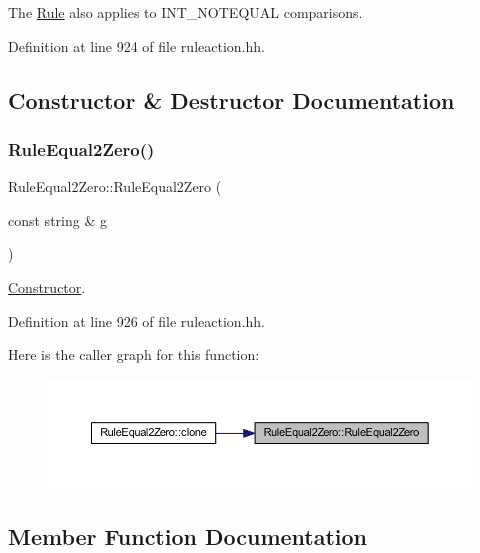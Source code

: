 The \mbox{\hyperlink{class_rule}{Rule}} also applies to I\+N\+T\+\_\+\+N\+O\+T\+E\+Q\+U\+AL comparisons. 

Definition at line 924 of file ruleaction.\+hh.



\subsection{Constructor \& Destructor Documentation}
\mbox{\label{class_rule_equal2_zero_a2dabc21e58113908e57df8192cc1c26f}} 
\subsubsection{\texorpdfstring{RuleEqual2Zero()}{RuleEqual2Zero()}}
{\footnotesize\ttfamily Rule\+Equal2\+Zero\+::\+Rule\+Equal2\+Zero (\begin{DoxyParamCaption}\item[{const string \&}]{g }\end{DoxyParamCaption})\hspace{0.3cm}{\ttfamily [inline]}}



\mbox{\hyperlink{class_constructor}{Constructor}}. 



Definition at line 926 of file ruleaction.\+hh.

Here is the caller graph for this function\+:
\nopagebreak
\begin{figure}[H]
\begin{center}
\leavevmode
\includegraphics[width=350pt]{class_rule_equal2_zero_a2dabc21e58113908e57df8192cc1c26f_icgraph}
\end{center}
\end{figure}


\subsection{Member Function Documentation}
\mbox{\label{class_rule_equal2_zero_a4451f6e9c8236e504f80f6c57edda360}} 
